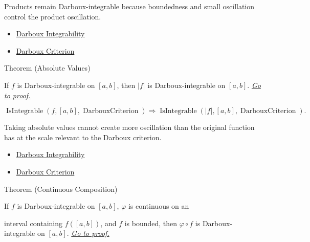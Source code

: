 \begin{remark*}[Interpretation]
Products remain Darboux-integrable because boundedness and small oscillation
control the product oscillation.
\end{remark*}

\begin{dependencies}
\begin{itemize}
  \item \hyperref[def:darboux-integrability]{Darboux Integrability}
  \item \hyperref[thm:darboux-criterion]{Darboux Criterion}
\end{itemize}
\end{dependencies}

\begin{theorembox}{Theorem (Absolute Values)}
\begin{theorem}
\label{thm:darboux-integrable-absolute-value}
If \(f\) is Darboux-integrable on \([a,b]\), then \(|f|\) is
Darboux-integrable on \([a,b]\).
\hyperref[prf:darboux-integrable-absolute-value]{\textit{Go to proof.}}
\end{theorem}
\end{theorembox}

\begin{remark*}
\[
\operatorname{IsIntegrable}(f,[a,b],\operatorname{DarbouxCriterion})
\Longrightarrow
\operatorname{IsIntegrable}(|f|,[a,b],\operatorname{DarbouxCriterion}).
\]
\end{remark*}

\begin{remark*}[Interpretation]
Taking absolute values cannot create more oscillation than the original
function has at the scale relevant to the Darboux criterion.
\end{remark*}

\begin{dependencies}
\begin{itemize}
  \item \hyperref[def:darboux-integrability]{Darboux Integrability}
  \item \hyperref[thm:darboux-criterion]{Darboux Criterion}
\end{itemize}
\end{dependencies}

\begin{theorembox}{Theorem (Continuous Composition)}
\begin{theorem}
\label{thm:darboux-integrable-continuous-composition}
If \(f\) is Darboux-integrable on \([a,b]\), \(\varphi\) is continuous on an

interval containing \(f([a,b])\), and \(f\) is bounded, then
\(\varphi\circ f\) is Darboux-integrable on \([a,b]\).
\hyperref[prf:darboux-integrable-continuous-composition]{\textit{Go to proof.}}
\end{theorem}
\end{theorembox}

